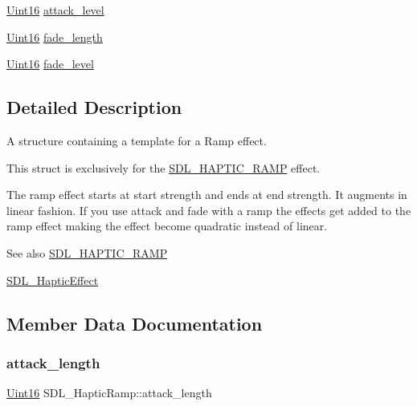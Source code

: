 \begin{DoxyCompactItemize}
\item 
\hyperlink{_s_d_l__stdinc_8h_a31fcc0a076c9068668173ee26d33e42b}{Uint16} \hyperlink{struct_s_d_l___haptic_ramp_a755933bbda14ae9b53c574b9fe6291a0}{attack\+\_\+level}
\item 
\hyperlink{_s_d_l__stdinc_8h_a31fcc0a076c9068668173ee26d33e42b}{Uint16} \hyperlink{struct_s_d_l___haptic_ramp_ad58a8f7cfdf659b45f0503fc56db7436}{fade\+\_\+length}
\item 
\hyperlink{_s_d_l__stdinc_8h_a31fcc0a076c9068668173ee26d33e42b}{Uint16} \hyperlink{struct_s_d_l___haptic_ramp_a66b586f2e6a23a085a7b2854f61752c5}{fade\+\_\+level}
\end{DoxyCompactItemize}


\subsection{Detailed Description}
A structure containing a template for a Ramp effect. 

This struct is exclusively for the \hyperlink{_s_d_l__haptic_8h_af10eb937a64a8f602e9c46682ac0d868}{S\+D\+L\+\_\+\+H\+A\+P\+T\+I\+C\+\_\+\+R\+A\+MP} effect.

The ramp effect starts at start strength and ends at end strength. It augments in linear fashion. If you use attack and fade with a ramp the effects get added to the ramp effect making the effect become quadratic instead of linear.

\begin{DoxySeeAlso}{See also}
\hyperlink{_s_d_l__haptic_8h_af10eb937a64a8f602e9c46682ac0d868}{S\+D\+L\+\_\+\+H\+A\+P\+T\+I\+C\+\_\+\+R\+A\+MP} 

\hyperlink{union_s_d_l___haptic_effect}{S\+D\+L\+\_\+\+Haptic\+Effect} 
\end{DoxySeeAlso}


\subsection{Member Data Documentation}
\mbox{\label{struct_s_d_l___haptic_ramp_adbcd7ffb05016d442c73e81cc0fcbbd2}} 
\subsubsection{\texorpdfstring{attack\+\_\+length}{attack\_length}}
{\footnotesize\ttfamily \hyperlink{_s_d_l__stdinc_8h_a31fcc0a076c9068668173ee26d33e42b}{Uint16} S\+D\+L\+\_\+\+Haptic\+Ramp\+::attack\+\_\+length}

